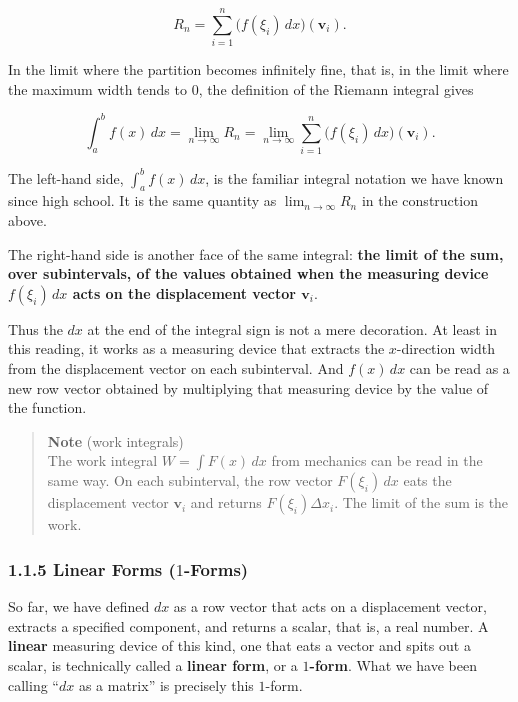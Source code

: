 \documentclass[a4paper,12pt,openany]{book}
\begin{document}
\[
R_n
=
\sum_{i=1}^n
\bigl(f(\xi_i)\,dx\bigr)(\mathbf{v}_i).
\]

In the limit where the partition becomes infinitely fine, that is, in
the limit where the maximum width tends to \(0\), the definition of the
Riemann integral gives

\[
\int_a^b f(x)\,dx
=
\lim_{n\to\infty} R_n
=
\lim_{n\to\infty}
\sum_{i=1}^n
\bigl(f(\xi_i)\,dx\bigr)(\mathbf{v}_i).
\]

The left-hand side, \(\int_a^b f(x)\,dx\), is the familiar integral
notation we have known since high school. It is the same quantity as
\(\lim_{n\to\infty}R_n\) in the construction above.

The right-hand side is another face of the same integral:
\textbf{the limit of the sum, over subintervals, of the values obtained when the measuring device $f(\xi_i)\,dx$ acts on the displacement vector $\mathbf{v}_i$}.

Thus the \(dx\) at the end of the integral sign is not a mere
decoration. At least in this reading, it works as a measuring device
that extracts the \(x\)-direction width from the displacement vector on
each subinterval. And \(f(x)\,dx\) can be read as a new row vector
obtained by multiplying that measuring device by the value of the
function.

\begin{quote}
\textbf{Note} (work integrals)\\
The work integral \(W=\int F(x)\,dx\) from mechanics can be read in the
same way. On each subinterval, the row vector \(F(\xi_i)\,dx\) eats the
displacement vector \(\mathbf{v}_i\) and returns \(F(\xi_i)\Delta x_i\).
The limit of the sum is the work.
\end{quote}

\hypertarget{linear-forms-1-forms}{%
\subsubsection{\texorpdfstring{1.1.5 Linear Forms
(\(1\)-Forms)}{1.1.5 Linear Forms (1-Forms)}}\label{linear-forms-1-forms}}

So far, we have defined \(dx\) as a row vector that acts on a
displacement vector, extracts a specified component, and returns a
scalar, that is, a real number. A \textbf{linear} measuring device of
this kind, one that eats a vector and spits out a scalar, is technically
called a \textbf{linear form}, or a \textbf{$1$-form}. What we have been
calling ``\(dx\) as a matrix'' is precisely this \(1\)-form.
\end{document}
